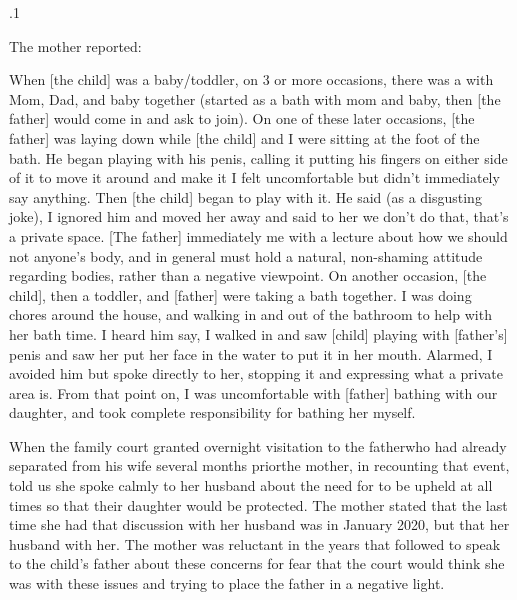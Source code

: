 \documentclass[11pt, twoside]{article}
\begin{document}
{{}%

\p.1{%
The mother reported:

\begin{blockQuote}
When [the child] was a baby/toddler, on 3 or more occasions, there
was a  with Mom, Dad, and baby together (started as
a bath with mom and baby, then [the father] would come in and
ask to join). On one of these later occasions, [the father] was laying
down while [the child] and I were sitting at the foot of the bath. He
began playing with his penis, calling it  putting his fingers
on either side of it to move it around and make it  I felt uncomfortable but didn’t immediately say anything. Then [the child]
began to play with it. He said (as a disgusting joke),  I ignored him and moved her away and said to her
we don’t do that, that’s a private space. [The father] immediately
 me with a lecture about how we should not 
anyone’s body, and in general must hold a natural, non-shaming
attitude regarding bodies, rather than a negative viewpoint.
\parbreak{}
On another occasion, [the child], then a toddler, and [father]
were taking a bath together. I was doing chores around the house,
and walking in and out of the bathroom to help with her bath
time. I heard him say,  I walked in and saw
[child] playing with [father’s] penis and saw her put her face in the
water to put it in her mouth. Alarmed, I avoided him but spoke
directly to her, stopping it and expressing what a private area is.
From that point on, I was uncomfortable with [father] bathing
with our daughter, and took complete responsibility for bathing
her myself.
\end{blockQuote}

\nip{}%
When the family court granted overnight visitation to the father\mdash{}who
had already separated from his wife several months prior\mdash{}the mother,
in recounting that event, told us she spoke calmly to her husband about
the need for  to be upheld at all times so that
their daughter would be protected. The mother stated that the last time
she had that discussion with her husband was in January 2020, but that
her husband  with her. The mother was reluctant in the years that followed to speak to the child’s father about these
concerns for fear that the court would think she was  with
these issues and trying to place the father in a negative light.
}%

}
\end{document}
